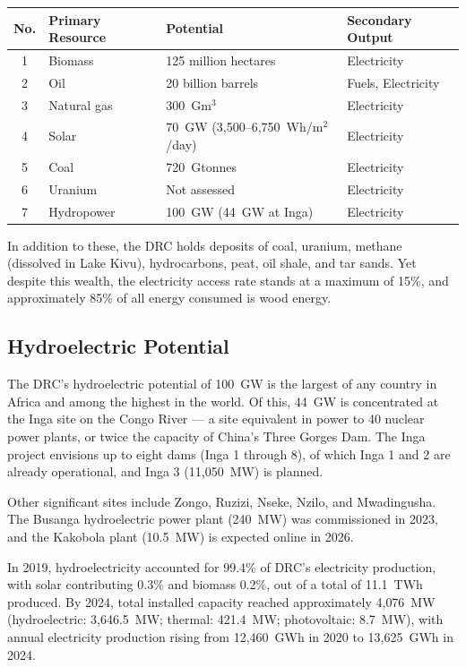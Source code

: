 \begin{center}
\begin{tabular}{clll}
\toprule
\textbf{No.} & \textbf{Primary Resource} & \textbf{Potential} & \textbf{Secondary Output} \\
\midrule
1 & Biomass         & 125 million hectares     & Electricity \\
2 & Oil             & 20 billion barrels        & Fuels, Electricity \\
3 & Natural gas     & 300~Gm$^3$               & Electricity \\
4 & Solar           & 70~GW (3{,}500--6{,}750~Wh/m$^2$/day) & Electricity \\
5 & Coal            & 720~Gtonnes              & Electricity \\
6 & Uranium         & Not assessed             & Electricity \\
7 & Hydropower      & 100~GW (44~GW at Inga)   & Electricity \\
\bottomrule
\end{tabular}
\end{center}

In addition to these, the DRC holds deposits of coal, uranium, methane (dissolved in Lake Kivu), hydrocarbons, peat, oil shale, and tar sands. Yet despite this wealth, the electricity access rate stands at a maximum of 15\%, and approximately 85\% of all energy consumed is wood energy.

\subsection{Hydroelectric Potential}

The DRC's hydroelectric potential of 100~GW is the largest of any country in Africa and among the highest in the world. Of this, 44~GW is concentrated at the Inga site on the Congo River — a site equivalent in power to 40 nuclear power plants, or twice the capacity of China's Three Gorges Dam. The Inga project envisions up to eight dams (Inga 1 through 8), of which Inga 1 and 2 are already operational, and Inga 3 (11{,}050~MW) is planned.

Other significant sites include Zongo, Ruzizi, Nseke, Nzilo, and Mwadingusha. The Busanga hydroelectric power plant (240~MW) was commissioned in 2023, and the Kakobola plant (10.5~MW) is expected online in 2026.

In 2019, hydroelectricity accounted for 99.4\% of DRC's electricity production, with solar contributing 0.3\% and biomass 0.2\%, out of a total of 11.1~TWh produced. By 2024, total installed capacity reached approximately 4{,}076~MW (hydroelectric: 3{,}646.5~MW; thermal: 421.4~MW; photovoltaic: 8.7~MW), with annual electricity production rising from 12{,}460~GWh in 2020 to 13{,}625~GWh in 2024.

